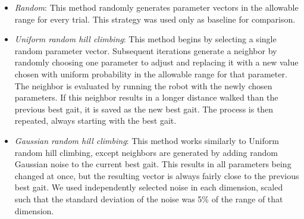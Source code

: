 


\begin{itemize}

\item \emph{Random}: This method randomly generates parameter vectors
  in the allowable range for every trial. This strategy was used only as baseline for comparison.

\item \emph{Uniform random hill climbing}: This method begins by
  selecting a single random parameter vector.  Subsequent iterations
  generate a neighbor by randomly choosing one parameter to adjust and
  replacing it with a new value chosen with uniform probability in the
  allowable range for that parameter. The neighbor is evaluated by
  running the robot with the newly chosen parameters. If this neighbor
  results in a longer distance walked than the previous best gait, it
  is saved as the new best gait. The process is then repeated, always
  starting with the best gait.

\item \emph{Gaussian random hill climbing}: This method works
  similarly to Uniform random hill climbing, except neighbors are
  generated by adding random Gaussian noise to the current best gait.
  This results in all parameters being changed at once, but the
  resulting vector is always fairly close to the previous best gait.
  We used independently selected noise in each dimension, scaled such
  that the standard deviation of the noise was 5\% of the range of
  that dimension.


\end{itemize}

